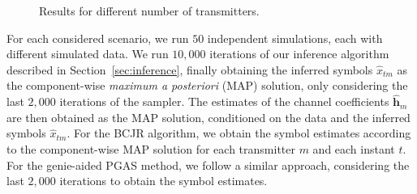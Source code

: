\documentclass[a4paper]{article}
\def\hathm{\hat{\mathbf{h}}_m}
\begin{document}
\begin{figure}[th]
\centering
{}
\vspace*{-3mm}
\caption{Results for different number of transmitters.}\label{fig:resultsNt}
\vspace*{-4mm}
\end{figure}

For each considered scenario, we run $50$ independent simulations, each with different simulated data. We run $10,000$ iterations of our inference algorithm described in Section~\ref{sec:inference}, finally obtaining the inferred symbols $\hat{x}_{tm}$ as the component-wise \textit{maximum a posteriori} (MAP) solution, only considering the last $2,000$ iterations of the sampler. The estimates of the channel coefficients $\hathm$ are then obtained as the MAP solution, conditioned on the data and the inferred symbols $\hat{x}_{tm}$. For the BCJR algorithm, we obtain the symbol estimates according to the component-wise MAP solution for each transmitter $m$ and each instant $t$. For the genie-aided PGAS method, we follow a similar approach, considering the last $2,000$ iterations to obtain the symbol estimates.
\end{document}
